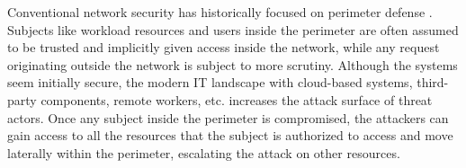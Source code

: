 \documentclass[english, 12pt, a4paper, sci, utf8, a-2b, online]{aaltothesis}
\begin{document}
Conventional network security has historically focused on perimeter defense \cite{kerman2020implementing}.
Subjects like workload resources and users inside the perimeter are often assumed to be trusted and implicitly given access inside the network, while any request originating outside the network is subject to more scrutiny.
Although the systems seem initially secure, the modern IT landscape with cloud-based systems, third-party components, remote workers, etc. increases the attack surface of threat actors.
Once any subject inside the perimeter is compromised, the attackers can gain access to all the resources that the subject is authorized to access and move laterally within the perimeter, escalating the attack on other resources.

\end{document}
